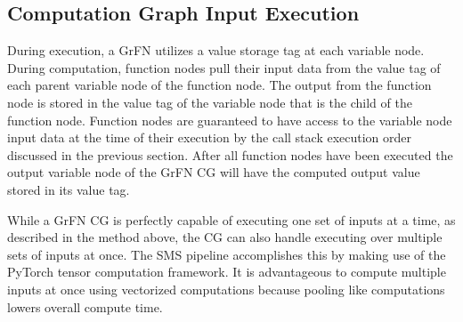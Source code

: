\subsection{Computation Graph Input Execution\label{sec:input_execution}}
During execution, a GrFN utilizes a value storage tag at each variable node.
During computation, function nodes pull their input data from the value tag of each parent variable node of the function node.
The output from the function node is stored in the value tag of the variable node that is the child of the function node.
Function nodes are guaranteed to have access to the variable node input data at the time of their execution by the call stack execution order discussed in the previous section.
After all function nodes have been executed the output variable node of the GrFN CG will have the computed output value stored in its value tag.

While a GrFN CG is perfectly capable of executing one set of inputs at a time, as described in the method above, the CG can also handle executing over multiple sets of inputs at once.
The SMS pipeline accomplishes this by making use of the PyTorch tensor computation framework.
It is advantageous to compute multiple inputs at once using vectorized computations because pooling like computations lowers overall compute time.
